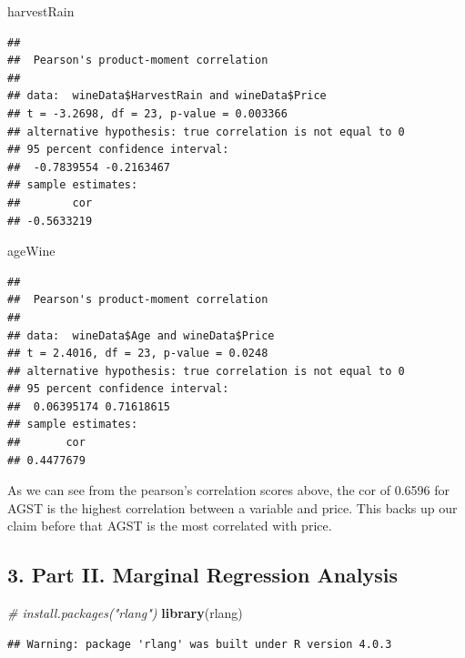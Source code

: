\documentclass[
]{article}
\newenvironment{Shaded}{\begin{snugshade}}{\end{snugshade}}
\newcommand{\CommentTok}[1]{\textcolor[rgb]{0.56,0.35,0.01}{\textit{#1}}}
\newcommand{\KeywordTok}[1]{\textcolor[rgb]{0.13,0.29,0.53}{\textbf{#1}}}
\newcommand{\NormalTok}[1]{#1}
\begin{document}
\begin{Shaded}
\begin{Highlighting}[]
\NormalTok{harvestRain}
\end{Highlighting}
\end{Shaded}

\begin{verbatim}
## 
##  Pearson's product-moment correlation
## 
## data:  wineData$HarvestRain and wineData$Price
## t = -3.2698, df = 23, p-value = 0.003366
## alternative hypothesis: true correlation is not equal to 0
## 95 percent confidence interval:
##  -0.7839554 -0.2163467
## sample estimates:
##        cor 
## -0.5633219
\end{verbatim}

\begin{Shaded}
\begin{Highlighting}[]
\NormalTok{ageWine}
\end{Highlighting}
\end{Shaded}

\begin{verbatim}
## 
##  Pearson's product-moment correlation
## 
## data:  wineData$Age and wineData$Price
## t = 2.4016, df = 23, p-value = 0.0248
## alternative hypothesis: true correlation is not equal to 0
## 95 percent confidence interval:
##  0.06395174 0.71618615
## sample estimates:
##       cor 
## 0.4477679
\end{verbatim}

As we can see from the pearson's correlation scores above, the cor of
0.6596 for AGST is the highest correlation between a variable and price.
This backs up our claim before that AGST is the most correlated with
price.

\hypertarget{part-ii.-marginal-regression-analysis}{%
\subsection{3. Part II. Marginal Regression
Analysis}\label{part-ii.-marginal-regression-analysis}}

\begin{Shaded}
\begin{Highlighting}[]
\CommentTok{# install.packages("rlang")}
\KeywordTok{library}\NormalTok{(rlang)}
\end{Highlighting}
\end{Shaded}

\begin{verbatim}
## Warning: package 'rlang' was built under R version 4.0.3
\end{verbatim}
\end{document}
